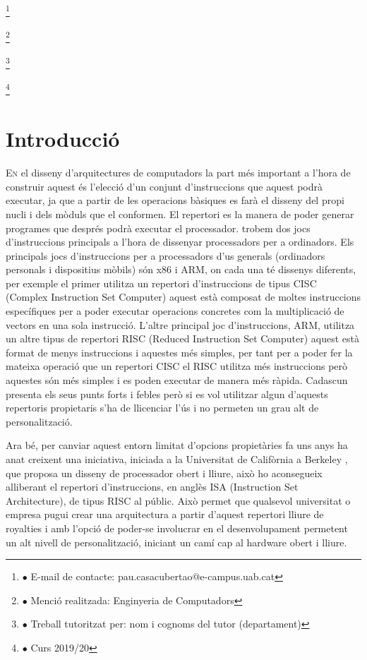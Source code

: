 \documentclass[10pt,a4paper,twocolumn,twoside]{article}
\newcommand\blfootnote[1]{%
  \begingroup
  \renewcommand\thefootnote{}\footnote{#1}%
  \addtocounter{footnote}{-1}%
  \endgroup
}
\begin{document}
\blfootnote{$\bullet$ E-mail de contacte: pau.casacubertao@e-campus.uab.cat}
\blfootnote{$\bullet$ Menció realitzada: Enginyeria de Computadors }
\blfootnote{$\bullet$ Treball tutoritzat per: nom i cognoms del tutor (departament)}
\blfootnote{$\bullet$ Curs 2019/20}



\section{Introducció}
\lettrine[lines=3]{E}{n} el disseny d'arquitectures de computadors la part més important a l'hora de construir aquest és l'elecció d'un conjunt d'instruccions que aquest podrà executar, ja que a partir de les operacions bàsiques es farà el disseny del propi nucli i dels mòduls que el conformen. 
El repertori es la manera de poder generar programes que després podrà executar el processador.  trobem dos jocs d'instruccions principals a l'hora de dissenyar processadors per a ordinadors. 
Els principals jocs d'instruccions per a processadors d'us generals (ordinadors personals i dispositius mòbils) són x86 i ARM, on cada una té dissenys diferents, per exemple el primer utilitza un repertori d'instruccions de tipus CISC (Complex Instruction Set Computer) aquest està composat de moltes instruccions específiques per a poder executar operacions concretes com la multiplicació de vectors en una sola instrucció. L'altre principal joc d'instruccions, ARM, utilitza un altre tipus de repertori RISC (Reduced Instruction Set Computer) aquest està format de menys instruccions i aquestes més simples, per tant per a poder fer la mateixa operació que un repertori CISC el RISC utilitza més instruccions però aquestes són més simples i es poden executar de manera més ràpida. Cadascun presenta els seus punts forts i febles però si es vol utilitzar algun d'aquests repertoris propietaris s'ha de llicenciar l'ús i no permeten un grau alt de personalització.

Ara bé, per canviar aquest entorn limitat d'opcions propietàries fa uns anys ha anat creixent una iniciativa, iniciada a la Universitat de Califòrnia a Berkeley \cite{krste_asanovic_instruction_2014}, que proposa un disseny de processador obert i lliure, això ho aconsegueix alliberant el repertori d'instruccions, en anglès ISA (Instruction Set Architecture), de tipus RISC al públic. Això permet que qualsevol universitat o empresa pugui crear una arquitectura a partir d'aquest repertori lliure de royalties i amb l'opció de poder-se involucrar en el desenvolupament permetent un alt nivell de personalització, iniciant un camí cap al hardware obert i lliure. 
\end{document}
